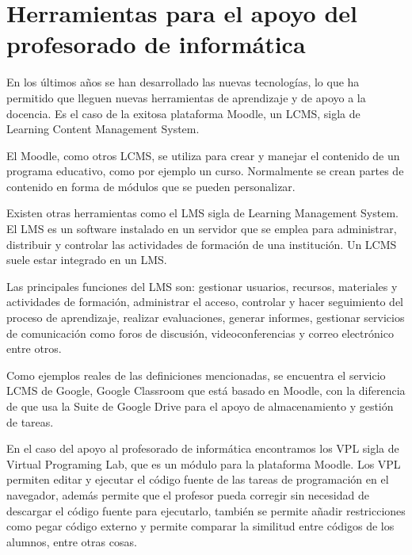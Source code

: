 
\section{Herramientas para el apoyo del profesorado de informática}
\label{1:sec:1}

En los últimos años se han desarrollado las nuevas tecnologías, lo que ha permitido que lleguen nuevas herramientas de aprendizaje y de apoyo a la docencia. Es el caso de la exitosa plataforma Moodle, un LCMS, sigla de Learning Content Management System. 

El Moodle, como otros LCMS, se utiliza para crear y manejar el contenido de un programa educativo, como por ejemplo un curso. Normalmente se crean partes de contenido en forma de módulos que se pueden personalizar.

Existen otras herramientas como el LMS sigla de Learning Management System. El LMS es un software instalado en un servidor que se emplea para administrar, distribuir y controlar las actividades de formación de una institución. Un LCMS suele estar integrado en un LMS.

Las principales funciones del LMS son: gestionar usuarios, recursos, materiales y actividades de formación, administrar el acceso, controlar y hacer seguimiento del proceso de aprendizaje, realizar evaluaciones, generar informes, gestionar servicios de comunicación como foros de discusión, videoconferencias y correo electrónico entre otros.

Como ejemplos reales de las definiciones mencionadas, se encuentra el servicio LCMS de Google, Google Classroom que está basado en Moodle, con la diferencia de que usa la Suite de Google Drive para el apoyo de almacenamiento y gestión de tareas.

En el caso del apoyo al profesorado de informática encontramos los VPL sigla de Virtual Programing Lab, \cite{B14} que es un módulo para la plataforma Moodle. Los VPL permiten editar y ejecutar el código fuente de las tareas de programación en el navegador, además permite que el profesor pueda corregir sin necesidad de descargar el código fuente para ejecutarlo, también se permite añadir restricciones como pegar código externo y permite comparar la similitud entre códigos de los alumnos, entre otras cosas.

